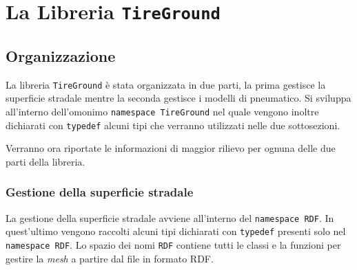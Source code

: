 \chapter{La Libreria \texttt{TireGround}}
\label{Codice}
%
\section{Organizzazione}
La libreria \texttt{TireGround} è stata organizzata in due parti, la prima gestisce la superficie stradale mentre la seconda gestisce i modelli di pneumatico. Si sviluppa all'interno dell'omonimo \texttt{namespace TireGround} nel quale vengono inoltre dichiarati con \texttt{typedef} alcuni tipi che verranno utilizzati nelle due sottosezioni.

Verranno ora riportate le informazioni di maggior rilievo per ognuna delle due parti della libreria.


\subsection{Gestione della superficie stradale} 
La gestione della superficie stradale avviene all'interno del \texttt{namespace RDF}. In quest'ultimo vengono raccolti alcuni tipi dichiarati con \texttt{typedef} presenti solo nel \texttt{namespace RDF}. Lo spazio dei nomi \texttt{RDF} contiene tutti le classi e la funzioni per gestire la \textit{mesh} a partire dal file in formato \ac{RDF}.
%
